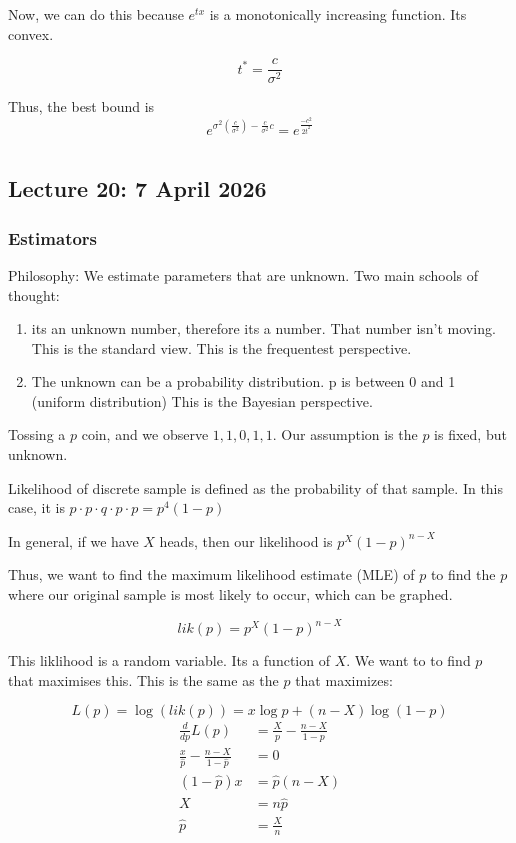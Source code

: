 \documentclass{report}
\begin{document}
Now, we can do this because $ e^{tx} $ is a monotonically increasing function. Its convex.  

\[
t^{*} = \frac{c}{\sigma^{2}}
\]

Thus, the best bound is
\[
e^{\sigma^{2} (\frac{c}{\sigma^{2}}) - \frac{c}{\sigma^{2}}c} = e^{\frac{-c^{2}}{2t^{2}}}
\]

\chapter{}
\section{Lecture 20: 7 April 2026}

\subsection{Estimators}

Philosophy: We estimate parameters that are unknown. Two main schools of thought: 
\begin{enumerate}
	\item its an unknown number, therefore its a number. That number isn't moving. This is the standard view. This is the frequentest perspective.
	\item The unknown can be a probability distribution. p is between 0 and 1 (uniform distribution) This is the Bayesian perspective.
\end{enumerate}


Tossing a $ p $ coin, and we observe $ 1,1,0,1,1 $. Our assumption is the $ p $ is fixed, but unknown.


Likelihood of discrete sample is defined as the probability of that sample. In this case, it is $ p \cdot p \cdot q  \cdot p \cdot p = p^{4}(1-p)$ 

In general, if we have $ X $ heads, then our likelihood is $ p^{X}(1-p)^{n-X} $ 

Thus, we want to find the maximum likelihood estimate (MLE) of $ p $ to find the $ p $ where our original sample is most likely to occur, which can be graphed. 

\[
lik(p) = p^{X}(1-p)^{n-X}
\]

This liklihood is a random variable. Its a function of $ X $. We want to to find $ p $ that maximises this. This is the same as the $ p $ that maximizes: 

\[
L(p) = \log (lik(p)) = x\log p + (n-X)\log(1-p)
\]
\begin{align*}
	\frac{d}{dp}L(p) &= \frac{X}{p} - \frac{n-X}{1-p} \\
	\frac{x}{\hat p} - \frac{n-X}{1-\hat p} &= 0    \\
	(1- \hat p ) x &= \hat p (n-X) \\
	X &= n \hat p \\
	\hat p &=  \frac{X}{n} \\
\end{align*}
\end{document}
